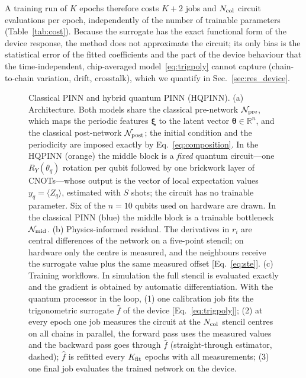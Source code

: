 \documentclass[floatfix,aps,pra,twocolumn,superscriptaddress,10pt,nofootinbib]{revtex4-2}
\newcommand{\Ncol}{N_{\rm col}}
\begin{document}
A training run of $K$ epochs therefore costs $K+2$ jobs and $\Ncol$ circuit evaluations per epoch, independently of the number of trainable parameters (Table~\ref{tab:cost}). Because the surrogate has the exact functional form of the device response, the method does not approximate the circuit; its only bias is the statistical error of the fitted coefficients and the part of the device behaviour that the time-independent, chip-averaged model~\eqref{eq:trigpoly} cannot capture (chain-to-chain variation, drift, crosstalk), which we quantify in Sec.~\ref{sec:res_device}.

\begin{figure}[t]
  \centering
  \resizebox{\textwidth}{!}{}
  \caption{\justifying
  Classical PINN and hybrid quantum PINN (HQPINN).
  (a) Architecture. Both models share the classical pre-network $\mathcal N_{\rm pre}$, which maps the periodic features $\bm\xi$ to the latent vector $\bm\theta\in\mathbb R^n$, and the classical post-network $\mathcal N_{\rm post}$; the initial condition and the periodicity are imposed exactly by Eq.~\eqref{eq:composition}. In the HQPINN (orange) the middle block is a \emph{fixed} quantum circuit---one $R_Y(\theta_q)$ rotation per qubit followed by one brickwork layer of CNOTs---whose output is the vector of local expectation values $y_q=\langle Z_q\rangle$, estimated with $S$ shots; the circuit has no trainable parameter. Six of the $n=10$ qubits used on hardware are drawn. In the classical PINN (blue) the middle block is a trainable bottleneck $\mathcal N_{\rm mid}$.
  (b) Physics-informed residual. The derivatives in $r_i$ are central differences of the network on a five-point stencil; on hardware only the centre is measured, and the neighbours receive the surrogate value plus the same measured offset [Eq.~\eqref{eq:ste}].
  (c) Training workflows. In simulation the full stencil is evaluated exactly and the gradient is obtained by automatic differentiation. With the quantum processor in the loop, (1) one calibration job fits the trigonometric surrogate $\hat f$ of the device [Eq.~\eqref{eq:trigpoly}]; (2) at every epoch one job measures the circuit at the $\Ncol$ stencil centres on all chains in parallel, the forward pass uses the measured values and the backward pass goes through $\hat f$ (straight-through estimator, dashed); $\hat f$ is refitted every $K_{\rm fit}$ epochs with all measurements; (3) one final job evaluates the trained network on the device.}
  \label{fig:schematic}
\end{figure}
\end{document}
